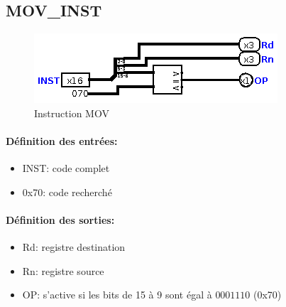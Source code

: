 \documentclass[a4paper]{article} %
\begin{document}
\subsection{MOV\_INST}

\begin{figure}[H]
    \centering
    \includegraphics[width=.8\textwidth]{src/MOV_INST.png}
    \caption{Instruction MOV}
    \label{mov}
\end{figure}
\paragraph{Définition des entrées:}
\begin{itemize}
    \item     INST: code complet
    \item     0x70: code recherché
\end{itemize}

\paragraph{Définition des sorties:}
\begin{itemize}
    \item     Rd: registre destination
    \item     Rn: registre source
    \item     OP: s'active si les bits de 15 à 9 sont égal à $0001110$ (0x70)
\end{itemize}

\medskip
\end{document}
